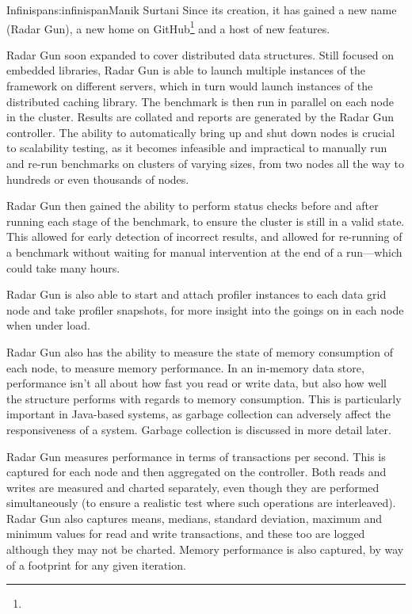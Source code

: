 \begin{aosachapter}{Infinispan}{s:infinispan}{Manik Surtani}
Since its creation, it has gained a new name (Radar Gun), a new home on
GitHub\footnote{} and a host of new
features.


Radar Gun soon expanded to cover distributed data structures. Still
focused on embedded libraries, Radar Gun is able to launch multiple
instances of the framework on different servers, which in turn would
launch instances of the distributed caching library. The benchmark is
then run in parallel on each node in the cluster. Results are collated
and reports are generated by the Radar Gun controller. The ability to
automatically bring up and shut down nodes is crucial to scalability
testing, as it becomes infeasible and impractical to manually run and
re-run benchmarks on clusters of varying sizes, from two nodes all the
way to hundreds or even thousands of nodes.



Radar Gun then gained the ability to perform status checks before and
after running each stage of the benchmark, to ensure the cluster is
still in a valid state. This allowed for early detection of incorrect
results, and allowed for re-running of a benchmark without waiting for
manual intervention at the end of a run---which could take many hours.


Radar Gun is also able to start and attach profiler instances to each
data grid node and take profiler snapshots, for more insight into the
goings on in each node when under load.


Radar Gun also has the ability to measure the state of memory
consumption of each node, to measure memory performance. In an
in-memory data store, performance isn't all about how fast you read or
write data, but also how well the structure performs with regards to
memory consumption. This is particularly important in Java-based
systems, as garbage collection can adversely affect the responsiveness
of a system. Garbage collection is discussed in more detail later.


Radar Gun measures performance in terms of transactions per second. This
is captured for each node and then aggregated on the controller. Both
reads and writes are measured and charted separately, even though they
are performed simultaneously (to ensure a realistic test where such
operations are interleaved). Radar Gun also captures means, medians,
standard deviation, maximum and minimum values for read and write
transactions, and these too are logged although they may not be charted.
Memory performance is also captured, by way of a footprint for any given
iteration.


\end{aosachapter}

